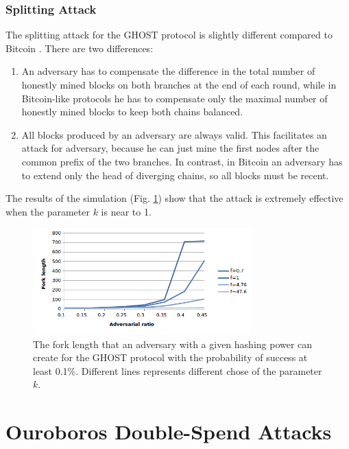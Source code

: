 \documentclass[10pt,a4paper]{article}
\numberwithin{equation}{section} %
\theoremstyle{plain}
\theoremstyle{definition}
\theoremstyle{remark}
\begin{document}
	\subsubsection{Splitting Attack}
	
	The splitting attack for the GHOST protocol is slightly different compared to Bitcoin \cite{KP15}. There are two differences:
	\begin{enumerate}
    	\item An adversary has to compensate the difference in the total number of honestly mined blocks on both branches at the end of each round, while in Bitcoin-like protocols he has to compensate only the maximal number of honestly mined blocks to keep both chains balanced.
    	\item All blocks produced by an adversary are always valid. This facilitates an attack for adversary, because he can just mine the first nodes after the common prefix of the two branches. In contrast, in Bitcoin an adversary has to extend only the head of diverging chains, so all blocks must be recent. 
	\end{enumerate}
	
	The results of the simulation (Fig. \ref{fig:ghost_split_chart}) show that the attack is extremely effective when the parameter \(k\) is near to 1.
	
	\begin{figure}[h] 
        \centering
        \includegraphics[width=0.75\textwidth]{ghost_split_chart}
        \caption{The fork length that an adversary with a given hashing power can create for the GHOST protocol with the probability of success at least 0.1\%. Different lines represents different chose of the parameter \(k\).}
        \label{fig:ghost_split_chart}
    \end{figure}
	
	\section{Ouroboros Double-Spend Attacks}
	
\end{document}
